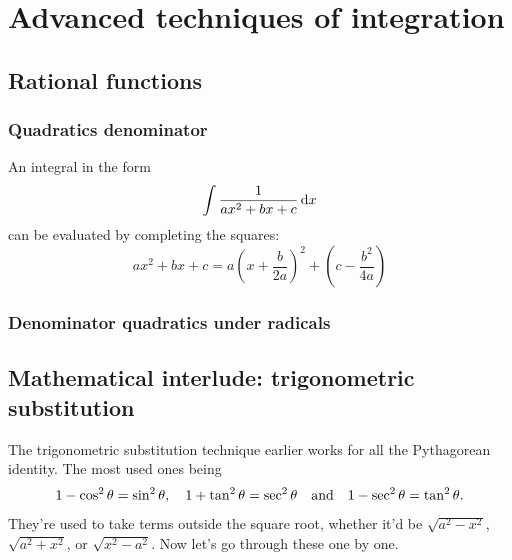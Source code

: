 \chapter{Advanced techniques of integration}
\label{sec:advancedtechniquesofintegration}

\begin{abstract}
  This is the chapter that explores more advanced techniques of integrations. You could go on with your life skipping this chapter and it'd still be fine. However, for the curious, there are some very interesting maths in here, so be sure to check this chapter out before going on to the next part of the book.
\end{abstract}

\section{Rational functions}
\label{eq:advtechniquesrationalfunctions}

\subsection{Quadratics denominator}

An integral in the form
\begin{equation}
  \int \frac{1}{ax^2 + bx + c}\odif{x}
\end{equation}
can be evaluated by completing the squares:
\begin{equation}
  ax^2 + bx + c = a\left(x + \frac{b}{2a}\right)^2 + \left(c - \frac{b^2}{4a}\right)
\end{equation}

\subsection{Denominator quadratics under radicals}

\section{Mathematical interlude: trigonometric substitution}

The trigonometric substitution technique earlier works for all the Pythagorean identity. The most used ones being
\begin{equation*}
  1 - \cos^2\theta = \sin^2\theta, \quad 1 + \tan^2\theta = \sec^2\theta \quad\textrm{and}\quad 1 - \sec^2\theta = \tan^2\theta.
\end{equation*}
They're used to take terms outside the square root, whether it'd be $\sqrt{a^2 - x^2}$, $\sqrt{a^2 + x^2}$, or $\sqrt{x^2 - a^2}$. Now let's go through these one by one.

